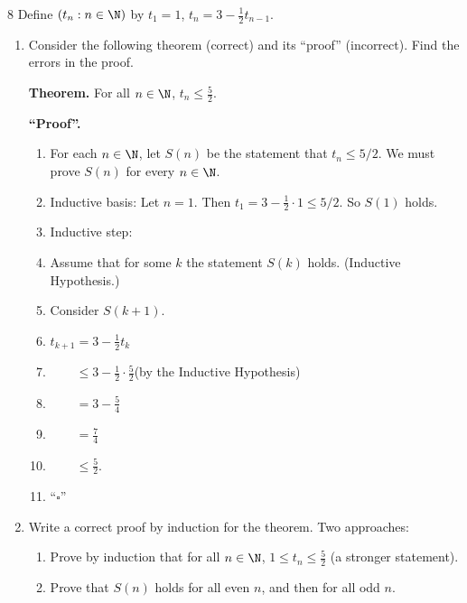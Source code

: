 \begin{exercise}{8}
    Define $(t_n:n\in\N)$ by $t_1=1$, $t_n=3-\frac12 t_{n-1}$.
    \begin{enumerate}[label=(\alph*)]
        \item Consider the following theorem (correct) and its ``proof''
              (incorrect). Find the errors in the proof.

              \textbf{Theorem.} For all $n\in\N$, $t_n\le\frac52$.

              \textbf{``Proof''.}
              \begin{enumerate}[label=\arabic*.]
                  \item For each $n\in\N$, let $S(n)$ be the statement that
                        $t_n\le5/2$. We must prove $S(n)$ for every $n\in\N$.
                  \item Inductive basis: Let $n=1$. Then
                        $t_1=3-\frac12\cdot1\le5/2$. So $S(1)$ holds.
                  \item Inductive step:
                  \item Assume that for some $k$ the statement $S(k)$ holds.
                        (Inductive Hypothesis.)
                  \item Consider $S(k+1)$.
                  \item $t_{k+1} = 3-\frac12 t_k$
                  \item $\phantom{t_{k+1}}\le 3-\frac12\cdot\frac52$\quad (by the
                        Inductive Hypothesis)
                  \item $\phantom{t_{k+1}}= 3-\frac54$
                  \item $\phantom{t_{k+1}}= \frac74$
                  \item $\phantom{t_{k+1}}\le\frac52$.
                  \item[11.] \hfill``$\square$''
              \end{enumerate}
        \item Write a correct proof by induction for the theorem. Two approaches:
              \begin{enumerate}[label=(\roman*)]
                  \item Prove by induction that for all $n\in\N$,
                        $1\le t_n\le\frac52$ (a stronger statement).
                  \item Prove that $S(n)$ holds for all even $n$, and then for all
                        odd $n$.
              \end{enumerate}
    \end{enumerate}
\end{exercise}

